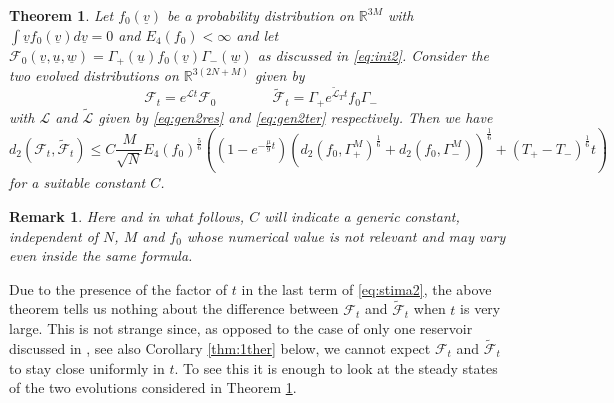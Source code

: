 \documentclass{article}
\def\red{}
\newcommand{\scrF}{{\mathscr F}}
\newcommand \ul[1]{\underline{#1}}
\newtheorem{mythm}{Theorem}[section]
\newtheorem{myrmk}{Remark}
\begin{document}
\begin{mythm}\label{thm:2ther}
Let $f_0(\underline v)$ be a probability distribution on $\mathds R^{3M}$ with \red{$\int \ul v f_0(\ul v)d\ul v=0$ and} $E_4(f_0)<\infty$ and let
$\scrF_0(\underline v,\underline u,\underline w)=\Gamma_+(\underline u)f_0(\underline v)\Gamma_-(\underline w)$ as
discussed in \eqref{eq:ini2}. Consider the two evolved distributions on $\mathds R^{3(2N+M)}$ given by
\[
 \scrF_t=e^{\mathcal L t}\scrF_0\qquad\qquad
 \widetilde \scrF_t=\Gamma_+ e^{\widetilde{\mathcal L}_T t}f_0\Gamma_-
\]
with $\mathcal L$ and $\widetilde{\mathcal L}$ given by \eqref{eq:gen2res} and \eqref{eq:gen2ter} respectively. Then we
have
\begin{equation}\label{eq:stima2}
 d_2(\scrF_t,\widetilde \scrF_t)\leq 
C \frac{M}{\sqrt N}E_4(f_0)^{\frac56}\left((1-e^{-\frac\mu9t})\left(d_2(f_0,\Gamma^M_{+})^{\frac 
16}+d_2(f_0,\Gamma^M_{-})\right)^{\frac 16}+
(T_+-T_-)^{\frac 16}t
\right)
\end{equation}
for a suitable constant $C$.
\end{mythm}

\begin{myrmk}\emph{
Here and in what follows, $C$ will indicate a generic constant, independent of
$N$, $M$ and $f_0$ whose numerical value is not relevant and may vary even
inside the same formula.}
\end{myrmk}


Due to the presence of the factor of $t$ in the last term of \eqref{eq:stima2}, the above theorem tells us nothing about
the difference between $\scrF_t$ and $\widetilde \scrF_t$ when $t$ is very large.  This is not strange since, as opposed
to the case of only one reservoir discussed in \cite{BLTV}, see also Corollary \ref{thm:1ther} below, we cannot expect
$\scrF_t$ and $\widetilde \scrF_t$ to stay close uniformly in $t$. To see this it is enough to look at the steady states
of the two evolutions considered in Theorem \ref{thm:2ther}.
\end{document}
